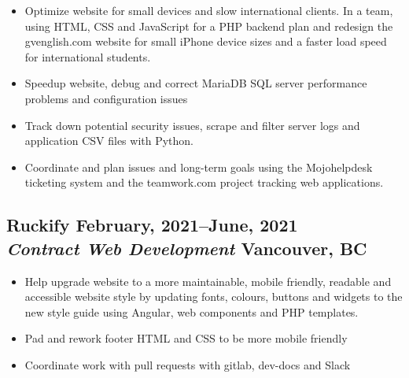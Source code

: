 \documentclass[oneside]{scrartcl}
\newcommand{\experience}[4]{
  \subsection[#1]{#1 \hfill \small #4 \\
  \textmd{\textit{#2} \hfill #3}}}
\begin{document}
\begin{itemize}
\item
  Optimize website for small devices and slow international
  clients. In a team, using HTML, CSS and JavaScript for a PHP backend
  plan and redesign the gvenglish.com website for small iPhone device
  sizes and a faster load speed for international students.
  
  \item Speedup website, debug and correct MariaDB SQL server
    performance problems and configuration issues

  \item
  Track down potential security issues, scrape and filter server logs
  and application CSV files with Python.

\item Coordinate and plan issues and long-term goals using the
  Mojohelpdesk ticketing system and the teamwork.com project tracking
  web applications.
\end{itemize}

\experience{Ruckify}
{Contract Web Development}{Vancouver, BC}{February, 2021--June, 2021}

\begin{itemize}

\item
  Help upgrade website to a more maintainable, mobile friendly,
  readable and accessible website style by updating fonts, colours,
  buttons and widgets to the new style guide using Angular, web
  components and PHP templates.

    
\item Pad and rework footer HTML and CSS to be more mobile friendly
\item Coordinate work with pull requests with gitlab, dev-docs and Slack
\end{itemize}
\end{document}
